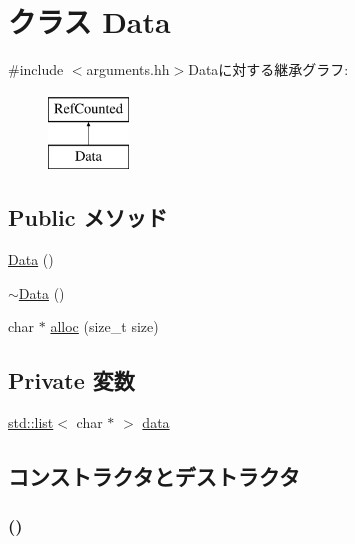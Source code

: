 \hypertarget{classArguments_1_1Data}{
\section{クラス Data}
\label{classArguments_1_1Data}
}


{\ttfamily \#include $<$arguments.hh$>$}Dataに対する継承グラフ:\begin{figure}[H]
\begin{center}
\leavevmode
\includegraphics[height=2cm]{classArguments_1_1Data}
\end{center}
\end{figure}
\subsection*{Public メソッド}
\begin{DoxyCompactItemize}
\item 
\hyperlink{classArguments_1_1Data_a51d806137473e32bc8e082f8beb3133a}{Data} ()
\item 
\hyperlink{classArguments_1_1Data_a6da8ae30c57cc1732f240fc3496ee7de}{$\sim$Data} ()
\item 
char $\ast$ \hyperlink{classArguments_1_1Data_aeb27080055c9e3a4b7844ccabbd6b823}{alloc} (size\_\-t size)
\end{DoxyCompactItemize}
\subsection*{Private 変数}
\begin{DoxyCompactItemize}
\item 
\hyperlink{classstd_1_1list}{std::list}$<$ char $\ast$ $>$ \hyperlink{classArguments_1_1Data_acd34815bf6806434e82e5ce7e9656b16}{data}
\end{DoxyCompactItemize}


\subsection{コンストラクタとデストラクタ}
\hypertarget{classArguments_1_1Data_a51d806137473e32bc8e082f8beb3133a}{
\subsubsection[{Data}]{ ()}}
\label{classArguments_1_1Data_a51d806137473e32bc8e082f8beb3133a}



